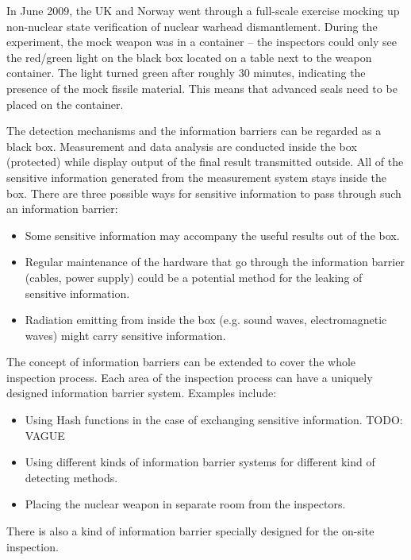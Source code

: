 \documentclass[twoside,titlepage,11pt,twocolumn,a4paper]{article}
\begin{document}
In June 2009, the UK and Norway went through a full-scale exercise
mocking up non-nuclear state verification of nuclear warhead
dismantlement.  During the experiment, the mock weapon was in a
container -- the inspectors could only see the red/green light on the
black box located on a table next to the weapon container. The light
turned green after roughly 30 minutes, indicating the presence of the
mock fissile material. This means that advanced seals need to be
placed on the container.

The detection mechanisms and the information barriers can be regarded
as a black box. Measurement and data analysis are conducted inside the
box (protected) while display output of the final result transmitted
outside. All of the sensitive information generated from the
measurement system stays inside the box. There are three possible ways
for sensitive information to pass through such an information barrier:
\begin{itemize}
  \item Some sensitive information may accompany the useful results
    out of the box.
  \item Regular maintenance of the hardware that go through the
    information barrier (cables, power supply) could be a potential
    method for the leaking of sensitive information.
  \item Radiation emitting from inside the box (e.g. sound waves,
    electromagnetic waves) might carry sensitive information.
\end{itemize}

The concept of information barriers can be extended to cover the whole
inspection process. Each area of the inspection process can have a
uniquely designed information barrier system. Examples include:
\begin{itemize}
  \item Using Hash functions in the case of exchanging sensitive
    information. \citep{knuth1976} TODO: VAGUE
  \item Using different kinds of information barrier systems for
    different kind of detecting methods.
  \item Placing the nuclear weapon in separate room from the
    inspectors.
\end{itemize}
There is also a kind of information barrier specially
designed for the on-site inspection.
\end{document}
